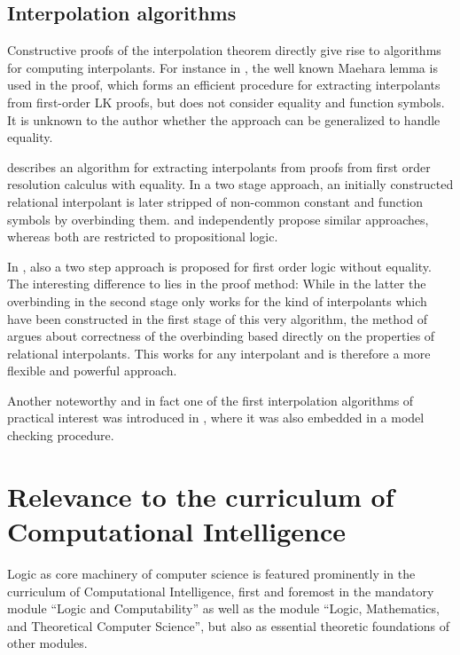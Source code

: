 \documentclass[,%
			paper=a4,%
			DIV11, %
			liststotoc,
			bibtotoc,
			draft=false,%
			numbers=noendperiod
			]{scrartcl}
\begin{document}
\subsection{Interpolation algorithms}
\label{algos}

Constructive proofs of the interpolation theorem directly give rise to algorithms for computing interpolants.
For instance in \cite[theorem 6.6]{takeuti1987proof}, the well known Maehara lemma is used in the proof, which forms an efficient procedure for extracting interpolants from first-order LK proofs, but does not consider equality and function symbols.
It is unknown to the author whether the approach can be generalized to handle equality.

\cite{Huang95} describes an algorithm for extracting interpolants from proofs from first order resolution calculus with equality.
In a two stage approach, an initially constructed relational interpolant is later stripped of non-common constant and function symbols by overbinding them.
\cite{Pudlak97} and \cite{krajivcek1997interpolation} independently propose similar approaches, whereas both are restricted to propositional logic.

In \cite{baaz2011methods}, also a two step approach is proposed for first order logic without equality.
The interesting difference to \cite{Huang95} lies in the proof method:
While in the latter the overbinding in the second stage only works for the kind of interpolants which have been constructed in the first stage of this very algorithm, the method of \cite{baaz2011methods} argues about correctness of the overbinding based directly on the properties of relational interpolants.
This works for any interpolant and is therefore a more flexible and powerful approach.

Another noteworthy and in fact one of the first interpolation algorithms of practical interest was introduced in \cite{McMillan03}, where it was also embedded in a model checking procedure.




\section{Relevance to the curriculum of Computational Intelligence}

Logic as core machinery of computer science is featured prominently in the curriculum of Computational Intelligence, first and foremost in the mandatory module ``Logic and Computability'' as well as the module ``Logic, Mathematics, and Theoretical Computer Science'', but also as essential theoretic foundations of other modules. 
\end{document}
